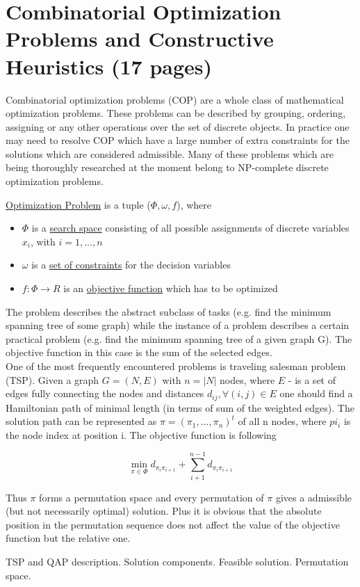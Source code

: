 \section{Combinatorial Optimization Problems and Constructive
Heuristics (17 pages)}

Combinatorial optimization problems (COP) are a whole class of mathematical optimization problems. These problems can be described by grouping, ordering, assigning or any other operations over the set of discrete objects. In practice one may need to resolve COP which have a large number of extra constraints for the solutions which are considered admissible. Many of these problems which are being thoroughly researched at the moment belong to NP-complete discrete optimization problems.

\begin{definition}
	\underline{Optimization Problem} is a tuple ($\Phi,\omega, f$), where
	\begin{itemize}
		\item{$\Phi$ is a \underline{search space} consisting of all possible assignments of discrete variables $x_i$, with $i=1,...,n$ }
		\item{$\omega$ is a \underline{set of constraints} for the decision variables}
		\item{$f:\Phi \to R$ is an \underline{objective function} which has to be optimized}
	\end{itemize}
\end{definition}

The problem describes the abstract subclass of tasks (e.g. find the minimum spanning tree of some graph) while the instance of a problem describes a certain practical problem (e.g. find the minimum spanning tree of a given graph G). The objective function in this case is the sum of the selected edges. \\
One of the most frequently encountered problems is traveling salesman problem (TSP). Given a graph $G=(N,E)$ with $n=|N|$ nodes, where $E$ - is a set of edges fully connecting the nodes and distances $d_{ij}, \forall(i,j) \in E$ one should find a Hamiltonian path of minimal length (in terms of sum of the weighted edges). The solution path can be represented as $\pi=(\pi_1,...,\pi_n)^t$ of all n nodes, where $pi_i$ is the node index at position i. The objective function is following

\begin{equation}
\min \limits_{\pi \in \Phi} {d_{\pi_i \pi_{i+1}}} + \sum \limits_{i+1}^{n-1} {d_{\pi_i \pi_{i+1}}}
\end{equation}

Thus $\pi$ forms a permutation space and every permutation of $\pi$ gives a admissible (but not necessarily optimal) solution. Plus it is obvious that the absolute position in the permutation sequence does not affect the value of the objective function but the relative one.

TSP and QAP description.
Solution components.
Feasible solution.
Permutation space.
